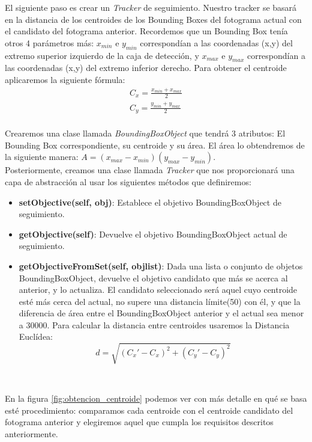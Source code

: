 El siguiente paso es crear un \textit{Tracker} de seguimiento. Nuestro tracker se basará en la distancia de los centroides de los Bounding Boxes del fotograma actual con el candidato del fotograma anterior. Recordemos que un Bounding Box tenía otros 4 parámetros más: $x_{min}$ e $y_{min}$ correspondían a las coordenadas (x,y) del extremo superior izquierdo de la caja de detección, y $x_{max}$ e $y_{max}$ correspondían a las coordenadas (x,y) del extremo inferior derecho. Para obtener el centroide aplicaremos la siguiente fórmula:\\
\begin{eqnarray*}
C_x = \frac{x_{min} + x_{max}}{2}\\
C_y = \frac{y_{min} + y_{max}}{2}\\
\end{eqnarray*}

Crearemos una clase llamada \textit{BoundingBoxObject} que tendrá 3 atributos: El Bounding Box correspondiente, su centroide y su área. El área lo obtendremos de la siguiente manera: $A = (x_{max} - x_{min}) (y_{max} - y_{min})$.\\

Posteriormente, creamos una clase llamada \textit{Tracker} que nos proporcionará una capa de abstracción al usar los siguientes métodos que definiremos:

\begin{itemize}
	\item \textbf{setObjective(self, obj)}: Establece el objetivo BoundingBoxObject de seguimiento.
	\item \textbf{getObjective(self)}: Devuelve el objetivo BoundingBoxObject actual de seguimiento.
	\item \textbf{getObjectiveFromSet(self, objlist)}: Dada una lista o conjunto de objetos BoundingBoxObject, devuelve el objetivo candidato que más se acerca al anterior, y lo actualiza. El candidato seleccionado será aquel cuyo centroide esté más cerca del actual, no supere una distancia límite(50) con él, y que la diferencia de área entre el BoundingBoxObject anterior y el actual sea menor a 30000. Para calcular la distancia entre centroides usaremos la Distancia Euclídea:
	\begin{equation*}
	d = \sqrt{(C_{x}' - C_{x})^2 + (C_{y}' - C_{y})^2}
	\end{equation*}
\end{itemize}\

En la figura \ref{fig:obtencion_centroide} podemos ver con más detalle en qué se basa esté procedimiento: comparamos cada centroide con el centroide candidato del fotograma anterior y elegiremos aquel que cumpla los requisitos descritos anteriormente.\\

